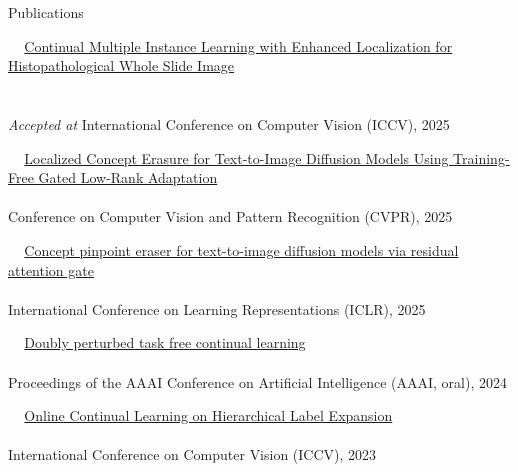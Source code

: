\documentclass{resume} %
\begin{document}
\begin{rSection}{Publications {}}

\textbullet~\,\, \href{https://arxiv.org/pdf/2507.02395}{Continual Multiple Instance Learning with Enhanced Localization for Histopathological Whole Slide Image \\ \hspace*{1.5em}{Analysis}} 
\\ 
\\ \hspace*{1.5em} \textit{Accepted at} International Conference on Computer Vision (ICCV), 2025


\textbullet~\,\, \href{https://arxiv.org/abs/2503.12356}{Localized Concept Erasure for Text-to-Image Diffusion Models Using Training-Free Gated Low-Rank Adaptation}
\\ 
\\ \hspace*{1.5em}Conference on Computer Vision and Pattern Recognition (CVPR), 2025


\textbullet~\,\, \href{https://arxiv.org/abs/2312.13027}{Concept pinpoint eraser for text-to-image diffusion models via residual attention gate}
\\ 
\\ \hspace*{1.5em}International Conference on Learning Representations (ICLR), 2025


\textbullet~\,\, \href{https://arxiv.org/abs/2312.13027}{Doubly perturbed task free continual learning}
\\ 
\\ \hspace*{1.5em}Proceedings of the AAAI Conference on Artificial Intelligence (AAAI, oral), 2024


\textbullet~\,\, \href{https://ieeexplore.ieee.org/document/10377260}{Online Continual Learning on Hierarchical Label Expansion
}
\\ 
\\ \hspace*{1.5em}International Conference on Computer Vision (ICCV), 2023



\end{rSection}
\end{document}
